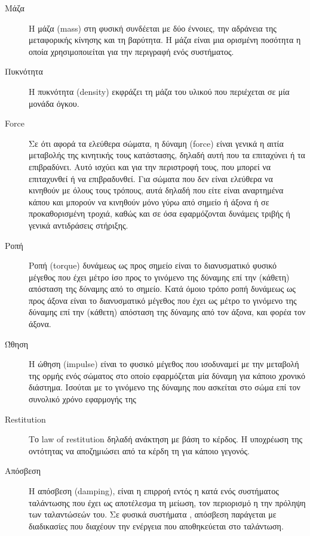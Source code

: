 \begin{description}
\item [Μάζα] Η μάζα (mass) στη φυσική συνδέεται με δύο έννοιες, την αδράνεια της μεταφορικής κίνησης και τη βαρύτητα. Η μάζα είναι μια ορισμένη ποσότητα η οποία χρησιμοποιείται για την περιγραφή ενός συστήματος.

\item [Πυκνότητα]  Η πυκνότητα (density) εκφράζει τη μάζα του υλικού που περιέχεται σε μία μονάδα όγκου. 

\item [Force] Σε ότι αφορά τα ελεύθερα σώματα, η δύναμη (force) είναι γενικά η αιτία μεταβολής της κινητικής τους κατάστασης, δηλαδή αυτή που τα επιταχύνει ή τα επιβραδύνει. Αυτό ισχύει και για την περιστροφή τους, που μπορεί να επιταχυνθεί ή να επιβραδυνθεί. Για σώματα που δεν είναι ελεύθερα να κινηθούν με όλους τους τρόπους, αυτά δηλαδή που είτε είναι αναρτημένα κάπου και μπορούν να κινηθούν μόνο γύρω από σημείο ή άξονα ή σε προκαθορισμένη τροχιά, καθώς και σε όσα εφαρμόζονται δυνάμεις τριβής ή γενικά αντιδράσεις στήριξης.

\item [Ροπή] Ροπή (torque) δυνάμεως ως προς σημείο είναι το διανυσματικό φυσικό μέγεθος που έχει μέτρο ίσο προς το γινόμενο της δύναμης επί την (κάθετη) απόσταση της δύναμης από το σημείο. Κατά όμοιο τρόπο ροπή δυνάμεως ως προς άξονα είναι το διανυσματικό μέγεθος που έχει ως μέτρο το γινόμενο της δύναμης επί την (κάθετη) απόσταση της δύναμης από τον άξονα, και φορέα τον άξονα.

\item [Ώθηση] Η ώθηση (impulse) είναι το φυσικό μέγεθος που ισοδυναμεί με την μεταβολή της ορμής ενός σώματος στο οποίο εφαρμόζεται μία δύναμη για κάποιο χρονικό διάστημα. Ισούται με το γινόμενο της δύναμης που ασκείται στο σώμα επί τον συνολικό χρόνο εφαρμογής της

\item [Restitution] Το law of restitution δηλαδή ανάκτηση με βάση το κέρδος. Η υποχρέωση της οντότητας να αποζημιώσει από τα κέρδη τη για κάποιο γεγονός. 

\item [Απόσβεση] Η απόσβεση (damping), είναι η επιρροή εντός η κατά ενός συστήματος ταλάντωσης που έχει ως αποτέλεσμα τη μείωση, τον περιορισμό η την πρόληψη των ταλαντώσεών του. Σε φυσικά συστήματα , απόσβεση παράγεται με διαδικασίες που διαχέουν την ενέργεια που αποθηκεύεται στο ταλάντωση.
\end{description}

